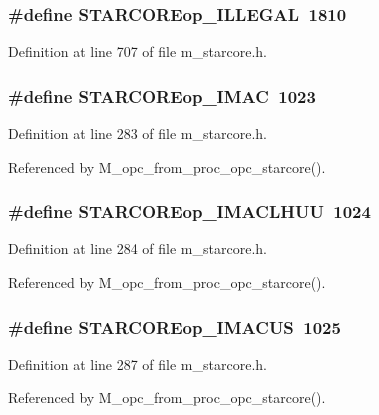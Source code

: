 \subsubsection{\setlength{\rightskip}{0pt plus 5cm}\#define STARCOREop\_\-ILLEGAL~1810}\label{m__starcore_8h_99b03ec23e5219ba3305774a1279b30f}




Definition at line 707 of file m\_\-starcore.h.
\subsubsection{\setlength{\rightskip}{0pt plus 5cm}\#define STARCOREop\_\-IMAC~1023}\label{m__starcore_8h_97f8fa3931d03a4e0e20010d89ff368b}




Definition at line 283 of file m\_\-starcore.h.

Referenced by M\_\-opc\_\-from\_\-proc\_\-opc\_\-starcore().
\subsubsection{\setlength{\rightskip}{0pt plus 5cm}\#define STARCOREop\_\-IMACLHUU~1024}\label{m__starcore_8h_d8abb4c115d2cd99e121dadd0542bc18}




Definition at line 284 of file m\_\-starcore.h.

Referenced by M\_\-opc\_\-from\_\-proc\_\-opc\_\-starcore().
\subsubsection{\setlength{\rightskip}{0pt plus 5cm}\#define STARCOREop\_\-IMACUS~1025}\label{m__starcore_8h_4082c33ce8b1fddd80109590d6980ff8}




Definition at line 287 of file m\_\-starcore.h.

Referenced by M\_\-opc\_\-from\_\-proc\_\-opc\_\-starcore().
